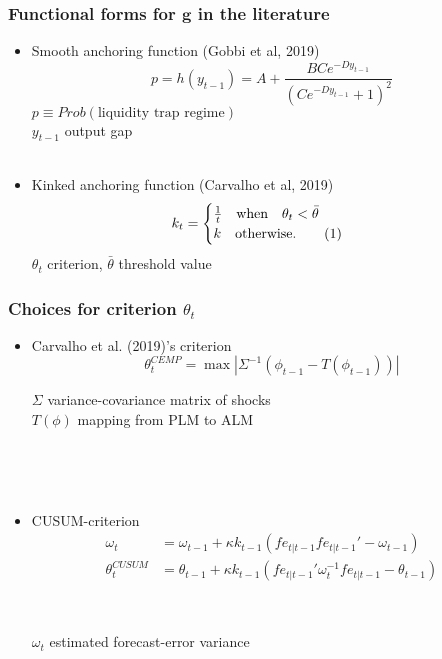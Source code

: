 \documentclass[11pt]{beamer}
\newcommand\numberthis{\addtocounter{equation}{1}\tag{\theequation}} %
\begin{document}
\begin{frame}[plain]  %
	\frametitle{Functional forms for $\mathbf{g}$ in the literature}
	\label{g}
\begin{itemize}
\item Smooth anchoring function (Gobbi et al, 2019)
\begin{equation}
 p = h(y_{t-1}) = A + \frac{B C e^{-D y_{t-1}}}{( C e^{-D y_{t-1}}+1)^2}
\end{equation}
$p \equiv Prob(\text{liquidity trap regime}) $ \\
$y_{t-1}$ output gap \\


\

\item Kinked anchoring function (Carvalho et al, 2019)
 \begin{align*}
k_t & = \begin{cases} \frac{1}{t} \quad \text{when} \quad \theta_t < \bar{\theta}  \\ k \quad \text{otherwise.}\numberthis
\end{cases} 
\end{align*}
$\theta_t$ criterion, $\bar{\theta}$ threshold value

\end{itemize}

\vfill 
\hyperlink{anchoring1}{}	

\end{frame}


\begin{frame}[plain]  %
	\frametitle{Choices for criterion $\theta_t$}
	\label{g}
\begin{itemize}
\item Carvalho et al. (2019)'s criterion  
\begin{equation}
\theta_t^{CEMP} = \max | \Sigma^{-1} ( \phi_{t-1} - T(\phi_{t-1})) |
\end{equation}


$\Sigma$ variance-covariance matrix of shocks \\
$T(\phi)$ mapping from PLM to ALM

\

\

\item CUSUM-criterion
\begin{align}
\omega_t & =  \omega_{t-1} + \kappa k_{t-1}(fe_{t|t-1} fe_{t|t-1}'  -\omega_{t-1})\\
\theta_t^{CUSUM} & =  \theta_{t-1} + \kappa k_{t-1}(fe_{t|t-1}'\omega_t^{-1}fe_{t|t-1} -\theta_{t-1})
\end{align}

\

$\omega_t$ estimated forecast-error variance
\end{itemize}




\vfill

\hyperlink{anchoring1}{}	


\end{frame}
\end{document}
